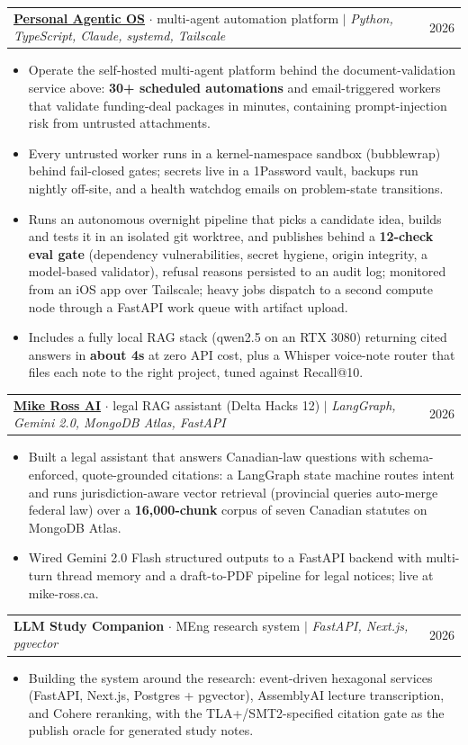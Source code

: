 \documentclass[letterpaper,11pt]{article}
\makeatletter
\newcommand{\resumeItem}[1]{
  \item\small{
    {#1\vspace{-2pt}}
  }
}
\newcommand{\resumeProjectHeading}[2]{
    \item
    \begin{tabular*}{0.97\textwidth}{l@{\extracolsep{\fill}}r}
      \small#1 & #2 \\
    \end{tabular*}\vspace{-7pt}
}
\newcommand{\resumeItemListStart}{\begin{itemize}}
\newcommand{\resumeItemListEnd}{\end{itemize}\vspace{-5pt}}
\makeatother
\begin{document}
      \resumeProjectHeading
          {\href{https://www.suleyman.io/architecture}{\underline{\textbf{Personal Agentic OS}}} $\cdot$ multi-agent automation platform $|$ \emph{Python, TypeScript, Claude, systemd, Tailscale}}{2026}
          \resumeItemListStart
            \resumeItem{Operate the self-hosted multi-agent platform behind the document-validation service above: \textbf{30+ scheduled automations} and email-triggered workers that validate funding-deal packages in minutes, containing prompt-injection risk from untrusted attachments.}
            \resumeItem{Every untrusted worker runs in a kernel-namespace sandbox (bubblewrap) behind fail-closed gates; secrets live in a 1Password vault, backups run nightly off-site, and a health watchdog emails on problem-state transitions.}
            \resumeItem{Runs an autonomous overnight pipeline that picks a candidate idea, builds and tests it in an isolated git worktree, and publishes behind a \textbf{12-check eval gate} (dependency vulnerabilities, secret hygiene, origin integrity, a model-based validator), refusal reasons persisted to an audit log; monitored from an iOS app over Tailscale; heavy jobs dispatch to a second compute node through a FastAPI work queue with artifact upload.}
            \resumeItem{Includes a fully local RAG stack (qwen2.5 on an RTX 3080) returning cited answers in \textbf{about 4s} at zero API cost, plus a Whisper voice-note router that files each note to the right project, tuned against Recall@10.}
          \resumeItemListEnd

      \resumeProjectHeading
          {\href{https://mike-ross.ca/}{\underline{\textbf{Mike Ross AI}}} $\cdot$ legal RAG assistant (Delta Hacks 12) $|$ \emph{LangGraph, Gemini 2.0, MongoDB Atlas, FastAPI}}{2026}
          \resumeItemListStart
            \resumeItem{Built a legal assistant that answers Canadian-law questions with schema-enforced, quote-grounded citations: a LangGraph state machine routes intent and runs jurisdiction-aware vector retrieval (provincial queries auto-merge federal law) over a \textbf{16,000-chunk} corpus of seven Canadian statutes on MongoDB Atlas.}
            \resumeItem{Wired Gemini 2.0 Flash structured outputs to a FastAPI backend with multi-turn thread memory and a draft-to-PDF pipeline for legal notices; live at mike-ross.ca.}
          \resumeItemListEnd

      \resumeProjectHeading
          {\textbf{LLM Study Companion} $\cdot$ MEng research system $|$ \emph{FastAPI, Next.js, pgvector}}{2026}
          \resumeItemListStart
            \resumeItem{Building the system around the research: event-driven hexagonal services (FastAPI, Next.js, Postgres + pgvector), AssemblyAI lecture transcription, and Cohere reranking, with the TLA+/SMT2-specified citation gate as the publish oracle for generated study notes.}
          \resumeItemListEnd
\end{document}
